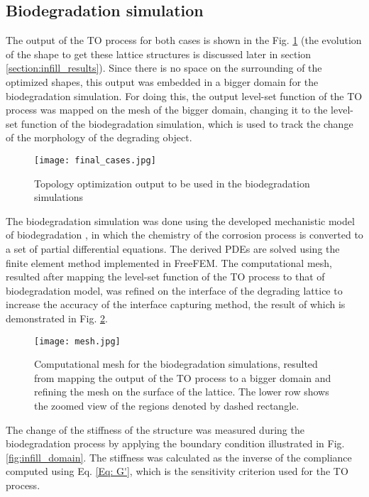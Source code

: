 \subsection{Biodegradation simulation}\label{section:biodegradation}

The output of the TO process for both cases is shown in the Fig. \ref{fig:infill_final_cases} (the evolution of the shape to get these lattice structures is discussed later in section \ref{section:infill_results}). Since there is no space on the surrounding of the optimized shapes, this output was embedded in a bigger domain for the biodegradation simulation. For doing this, the output level-set function of the TO process was mapped on the mesh of the bigger domain, changing it to the level-set function of the biodegradation simulation, which is used to track the change of the morphology of the degrading object. 

\begin{figure}[h]
\centering
\medskip
\texttt{[image: final\_cases.jpg]}
\caption[Topology optimization output to be used in the biodegradation simulations]{Topology optimization output to be used in the biodegradation simulations} \label{fig:infill_final_cases}
\end{figure}

The biodegradation simulation was done using the developed mechanistic model of biodegradation \cite{Barzegari2021}, in which the chemistry of the corrosion process is converted to a set of partial differential equations. The derived PDEs are solved using the finite element method implemented in FreeFEM. The computational mesh, resulted after mapping the level-set function of the TO process to that of biodegradation model, was refined on the interface of the degrading lattice to increase the accuracy of the interface capturing method, the result of which is demonstrated in Fig. \ref{fig:infill_mesh}.


\begin{figure}[h]
\centering
\medskip
\texttt{[image: mesh.jpg]}
\caption[Computational mesh for the biodegradation simulations]{Computational mesh for the biodegradation simulations, resulted from mapping the output of the TO process to a bigger domain and refining the mesh on the surface of the lattice. The lower row shows the zoomed view of the regions denoted by dashed rectangle.} \label{fig:infill_mesh}
\end{figure}

The change of the stiffness of the structure was measured during the biodegradation process by applying the boundary condition illustrated in Fig. \ref{fig:infill_domain}. The stiffness was calculated as the inverse of the compliance computed using Eq. \ref{Eq: G'}, which is the sensitivity criterion used for the TO process.  



